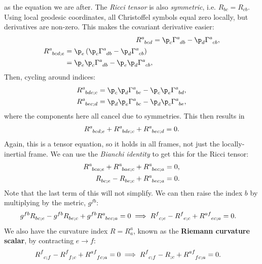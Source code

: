 \documentclass[a4paper, 11pt, normalem]{report}
\begin{document}
as the equation we are after.
The \emph{Ricci tensor} is also \emph{symmetric}, i.e. $R_{bc} = R_{cb}$.
Using local geodesic coordinates, all Christoffel symbols equal zero locally, but derivatives are non-zero.
This makes the covariant derivative easier:
\begin{align}
    \tensor{R}{^a_{bcd}} &= \p_c\tensor{\Gamma}{^a_{db}} - \p_d\tensor{\Gamma}{^a_{cb}}, \\
    \begin{split}
        \tensor{R}{^a_{bcd;e}} &= \p_e\left(\p_c\tensor{\Gamma}{^a_{db}} - \p_d\tensor{\Gamma}{^a_{cb}}\right) \\
                               &= \p_e\p_c\tensor{\Gamma}{^a_{db}} - \p_e\p_d\tensor{\Gamma}{^a_{cb}},
    \end{split}
\end{align}
Then, cycling around indices:
\begin{align}
    \tensor{R}{^a_{bde;c}} &= \p_c\p_d\tensor{\Gamma}{^a_{be}} - \p_c\p_e\tensor{\Gamma}{^a_{bd}},\\
    \tensor{R}{^a_{bec;d}} &= \p_d\p_e\tensor{\Gamma}{^a_{bc}} - \p_d\p_c\tensor{\Gamma}{^a_{be}},
\end{align}
where the components here all cancel due to symmetries. 
This then results in
\begin{align}
    \tensor{R}{^a_{bcd;e}} + \tensor{R}{^a_{bde;c}} + \tensor{R}{^a_{bec;d}} = 0.
\end{align}
Again, this is a tensor equation, so it holds in all frames, not just the locally-inertial frame. 
We can use the \emph{Bianchi identity} to get this for the Ricci tensor:
\begin{align}
    \tensor{R}{^a_{bca;e}} + \tensor{R}{^a_{bae;c}} + \tensor{R}{^a_{bec;a}} &= 0,\\
    \tensor{R}{_{bc;e}} - \tensor{R}{_{be;c}} + \tensor{R}{^a_{bec;a}} &= 0.
\end{align}
Note that the last term of this will not simplify.
We can then raise the index $b$ by multiplying by the metric, $g^{fb}$:
\begin{align}
    g^{fb}\tensor{R}{_{bc;e}} - g^{fb}\tensor{R}{_{be;c}} + g^{fb}\tensor{R}{^a_{bec;a}} &= 0 \implies \tensor{R}{^f_{c;e}} - \tensor{R}{^f_{e;c}} + \tensor{R}{^{af}_{ec;a}} = 0.
\end{align}
We also have the curvature index $R=R^a_a$, known as the \textbf{Riemann curvature scalar}, by contracting $e\to f$:
\begin{align}
    \tensor{R}{^f_{c;f}} - \tensor{R}{^f_{f;c}} + \tensor{R}{^{af}_{fc;a}} &= 0 \implies
    \tensor{R}{^f_{c;f}} - \tensor{R}{_{;c}} + \tensor{R}{^{af}_{fc;a}} = 0.
\end{align}
\end{document}
